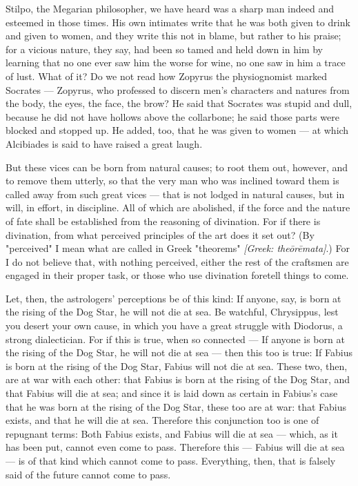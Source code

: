  Stilpo, the Megarian philosopher, we have heard was a sharp man indeed and esteemed in those times. His own intimates write that he was both given to drink and given to women, and they write this not in blame, but rather to his praise; for a vicious nature, they say, had been so tamed and held down in him by learning that no one ever saw him the worse for wine, no one saw in him a trace of lust. What of it? Do we not read how Zopyrus the physiognomist marked Socrates — Zopyrus, who professed to discern men's characters and natures from the body, the eyes, the face, the brow? He said that Socrates was stupid and dull, because he did not have hollows above the collarbone; he said those parts were blocked and stopped up. He added, too, that he was given to women — at which Alcibiades is said to have raised a great laugh.

 But these vices can be born from natural causes; to root them out, however, and to remove them utterly, so that the very man who was inclined toward them is called away from such great vices — that is not lodged in natural causes, but in will, in effort, in discipline. All of which are abolished, if the force and the nature of fate shall be established from the reasoning of divination. For if there is divination, from what perceived principles of the art does it set out? (By "perceived" I mean what are called in Greek "theorems" \textit{[Greek: theōrēmata]}.) For I do not believe that, with nothing perceived, either the rest of the craftsmen are engaged in their proper task, or those who use divination foretell things to come.

 Let, then, the astrologers' perceptions be of this kind: If anyone, say, is born at the rising of the Dog Star, he will not die at sea. Be watchful, Chrysippus, lest you desert your own cause, in which you have a great struggle with Diodorus, a strong dialectician. For if this is true, when so connected — If anyone is born at the rising of the Dog Star, he will not die at sea — then this too is true: If Fabius is born at the rising of the Dog Star, Fabius will not die at sea. These two, then, are at war with each other: that Fabius is born at the rising of the Dog Star, and that Fabius will die at sea; and since it is laid down as certain in Fabius's case that he was born at the rising of the Dog Star, these too are at war: that Fabius exists, and that he will die at sea. Therefore this conjunction too is one of repugnant terms: Both Fabius exists, and Fabius will die at sea — which, as it has been put, cannot even come to pass. Therefore this — Fabius will die at sea — is of that kind which cannot come to pass. Everything, then, that is falsely said of the future cannot come to pass.

